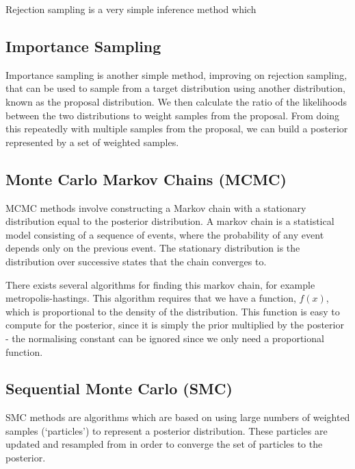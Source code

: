 Rejection sampling is a very simple inference method which 

\subsection{Importance Sampling}

Importance sampling is another simple method, improving on rejection sampling, that can be used to sample from a target distribution using another distribution, known as the proposal distribution. We then calculate the ratio of the likelihoods between the two distributions to weight samples from the proposal. From doing this repeatedly with multiple samples from the proposal, we can build a posterior represented by a set of weighted samples.


\subsection{Monte Carlo Markov Chains (MCMC)}

MCMC methods involve constructing a Markov chain with a stationary distribution equal to the posterior distribution. A markov chain is a statistical model consisting of a sequence of events, where the probability of any event depends only on the previous event. The stationary distribution is the distribution over successive states that the chain converges to.

There exists several algorithms for finding this markov chain, for example metropolis-hastings. This algorithm requires that we have a function, $f(x)$, which is proportional to the density of the distribution. This function is easy to compute for the posterior, since it is simply the prior multiplied by the posterior - the normalising constant can be ignored since we only need a proportional function.

\subsection{Sequential Monte Carlo (SMC)}

SMC methods are algorithms which are based on using large numbers of weighted samples (`particles') to represent a posterior distribution. These particles are updated and resampled from in order to converge the set of particles to the posterior.

